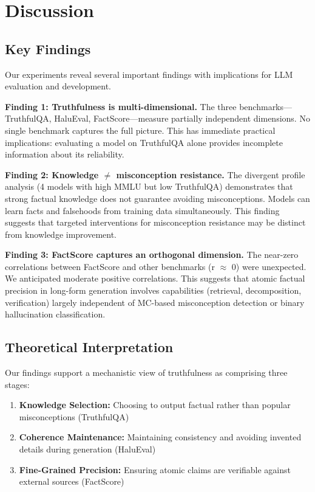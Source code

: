\section{Discussion}
\label{sec:discussion}

\subsection{Key Findings}

Our experiments reveal several important findings with implications for LLM evaluation and development.

\textbf{Finding 1: Truthfulness is multi-dimensional.} The three benchmarks---TruthfulQA, HaluEval, FactScore---measure partially independent dimensions. No single benchmark captures the full picture. This has immediate practical implications: evaluating a model on TruthfulQA alone provides incomplete information about its reliability.

\textbf{Finding 2: Knowledge $\neq$ misconception resistance.} The divergent profile analysis (4 models with high MMLU but low TruthfulQA) demonstrates that strong factual knowledge does not guarantee avoiding misconceptions. Models can learn facts and falsehoods from training data simultaneously. This finding suggests that targeted interventions for misconception resistance may be distinct from knowledge improvement.

\textbf{Finding 3: FactScore captures an orthogonal dimension.} The near-zero correlations between FactScore and other benchmarks (r $\approx$ 0) were unexpected. We anticipated moderate positive correlations. This suggests that atomic factual precision in long-form generation involves capabilities (retrieval, decomposition, verification) largely independent of MC-based misconception detection or binary hallucination classification.

\subsection{Theoretical Interpretation}

Our findings support a mechanistic view of truthfulness as comprising three stages:

\begin{enumerate}
\item \textbf{Knowledge Selection:} Choosing to output factual rather than popular misconceptions (TruthfulQA)
\item \textbf{Coherence Maintenance:} Maintaining consistency and avoiding invented details during generation (HaluEval)
\item \textbf{Fine-Grained Precision:} Ensuring atomic claims are verifiable against external sources (FactScore)
\end{enumerate}

